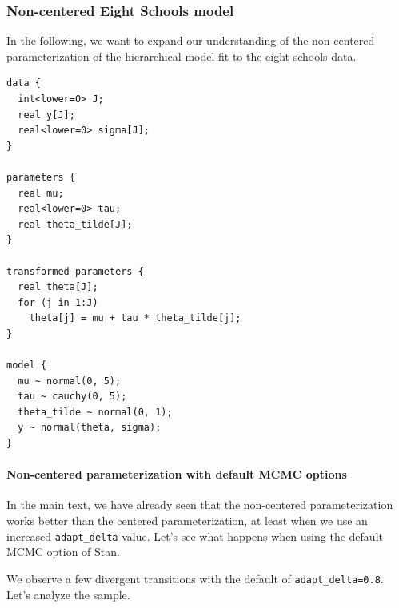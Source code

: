 \documentclass[american,]{article}
\let\oldparagraph\paragraph
\renewcommand{\paragraph}[1]{\oldparagraph{#1}\mbox{}}
\begin{document}
\hypertarget{non-centered-eight-schools-model-1}{%
\subsubsection*{Non-centered Eight Schools
model}\label{non-centered-eight-schools-model-1}}

In the following, we want to expand our understanding of the
non-centered parameterization of the hierarchical model fit to the eight
schools data.

\begin{verbatim}
data {
  int<lower=0> J;
  real y[J];
  real<lower=0> sigma[J];
}

parameters {
  real mu;
  real<lower=0> tau;
  real theta_tilde[J];
}

transformed parameters {
  real theta[J];
  for (j in 1:J)
    theta[j] = mu + tau * theta_tilde[j];
}

model {
  mu ~ normal(0, 5);
  tau ~ cauchy(0, 5);
  theta_tilde ~ normal(0, 1);
  y ~ normal(theta, sigma);
}
\end{verbatim}

\hypertarget{non-centered-parameterization-with-default-mcmc-options}{%
\paragraph{Non-centered parameterization with default MCMC
options}\label{non-centered-parameterization-with-default-mcmc-options}}

In the main text, we have already seen that the non-centered
parameterization works better than the centered parameterization, at
least when we use an increased \texttt{adapt\_delta} value. Let's see
what happens when using the default MCMC option of Stan.

We observe a few divergent transitions with the default of
\texttt{adapt\_delta=0.8}. Let's analyze the sample.
\end{document}
